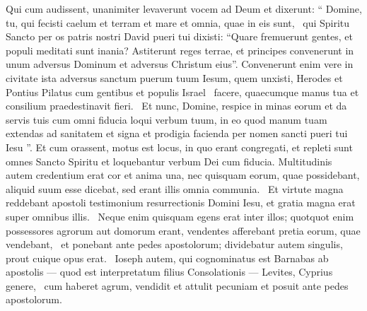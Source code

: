 \begin{biblechapter}
\begin{biblechapter}
\begin{biblechapter}
\begin{biblechapter}
 \verse Qui cum audissent, unanimiter levaverunt vocem ad Deum et dixerunt: “ Domine, tu, qui fecisti caelum et terram et mare et omnia, quae in eis sunt, 
 \verse qui Spiritu Sancto per os patris nostri David pueri tui dixisti:
 “Quare fremuerunt gentes,
 et populi meditati sunt inania?
 \verse Astiterunt reges terrae,
 et principes convenerunt in unum
 adversus Dominum et adversus Christum eius”.
 \verse Convenerunt enim vere in civitate ista adversus sanctum puerum tuum Iesum, quem unxisti, Herodes et Pontius Pilatus cum gentibus et populis Israel 
 \verse facere, quaecumque manus tua et consilium praedestinavit fieri. 
 \verse Et nunc, Domine, respice in minas eorum et da servis tuis cum omni fiducia loqui verbum tuum, \verse in eo quod manum tuam extendas ad sanitatem et signa et prodigia facienda per nomen sancti pueri tui Iesu ”.
 \verse Et cum orassent, motus est locus, in quo erant congregati, et repleti sunt omnes Sancto Spiritu et loquebantur verbum Dei cum fiducia.
 \verse Multitudinis autem credentium erat cor et anima una, nec quisquam eorum, quae possidebant, aliquid suum esse dicebat, sed erant illis omnia communia. 
 \verse Et virtute magna reddebant apostoli testimonium resurrectionis Domini Iesu, et gratia magna erat super omnibus illis. 
 \verse Neque enim quisquam egens erat inter illos; quotquot enim possessores agrorum aut domorum erant, vendentes afferebant pretia eorum, quae vendebant, 
 \verse et ponebant ante pedes apostolorum; dividebatur autem singulis, prout cuique opus erat. 
 \verse Ioseph autem, qui cognominatus est Barnabas ab apostolis — quod est interpretatum filius Consolationis — Levites, Cyprius genere, 
\verse cum haberet agrum, vendidit et attulit pecuniam et posuit ante pedes apostolorum.
 

\end{biblechapter}
\end{biblechapter}
\end{biblechapter}
\end{biblechapter}
